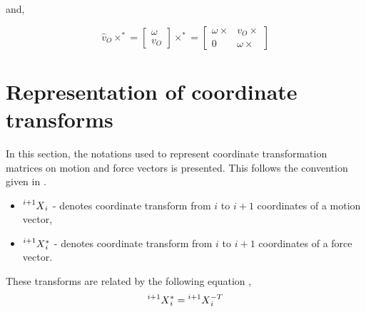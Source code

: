 	and,
	
	\begin{equation}
	\label{eq:cross2}
	\hat v_O \times^* = \begin{bmatrix}
	\omega \\ v_O
	\end{bmatrix} \times^* = \begin{bmatrix}
	\omega \times & v_O \times \\
	0 & \omega \times
	\end{bmatrix}
	\end{equation}
	
\chapter{Representation of coordinate transforms}\label{chap:coordinate}	

In this section, the notations used to represent coordinate transformation matrices on motion and force vectors is presented. This follows the convention given in \cite{featherstone2014rigid}.

\begin{itemize}
	\item $\prescript{i+1}{}{X}_i$ - denotes coordinate transform from $i$ to $i+1$ coordinates of a motion vector,
	\item $\prescript{i+1}{}{X}_i^*$ - denotes coordinate transform from $i$ to $i+1$ coordinates of a force vector.
\end{itemize}

These transforms are related by the following equation \cite{featherstone2014rigid},
$$ \prescript{i+1}{}{X}_i^* = \prescript{i+1}{}{X}_i^{-T}$$

